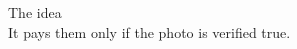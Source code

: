 \begin{frame}{The idea}
  \centering\vspace{1.5em}
  \\[1em]
  {\Large It pays them \alert{only if the photo is verified true}.}
\end{frame}
